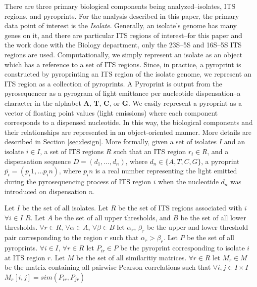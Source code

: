 \documentclass[12pt]{ucthesis}
\begin{document}
      There are three primary biological components being analyzed--isolates,
      ITS regions, and pyroprints. For the analysis described in this paper,
      the primary data point of interest is the \textit{Isolate}. Generally,
      an isolate's genome has many genes on it, and there are particular
      ITS regions of interest--for this paper and the work done with the
      Biology department, only the 23S--5S and 16S--5S ITS regions are used.
      Computationally, we simply represent an isolate as an object
      which has a reference to a set of ITS regions. Since, in practice, a
      pyroprint is constructed by pyroprinting an ITS region of the isolate
      genome, we represent an ITS region as a collection of pyroprints. A
      Pyroprint is output from the pyrosequencer as a pyrogram of light
      emittance per nucleotide dispensation--a character in the alphabet
      \textbf{A}, \textbf{T}, \textbf{C}, or \textbf{G}. We easily represent a
      pyroprint as a vector of floating point values (light emissions) where
      each component corresponds to a dispensed nucleotide. In this way, the
      biological components and their relationships are represented in an
      object-oriented manner. More details are described in Section
      \ref{sec:design}. More formally, given a set of isolates $I$ and an
      isolate $i \in I$, a set of ITS regions $R$ such that an ITS region $r_i
      \in R$, and a dispensation sequence $D = (d_1, \ldots, d_n)$, where $d_n
      \in \{A, T, C, G\}$, a pyroprint $\bar{p_i} = (p_i1,\ldots p_in)$, where
      $p_in$ is a real number representing the light emitted during the
      pyrosequencing process of ITS region $i$ when the nucleotide $d_n$ was
      introduced on dispensation $n$.

      Let $I$ be the set of all isolates. Let $R$ be the set of ITS regions
      associated with $i$ $\forall i \in I$ $R$. Let $A$ be the set of all upper
      thresholds, and $B$ be the set of all lower thresholds. $\forall r \in R$,
      $\forall \alpha \in A$, $\forall \beta \in B$ let $\alpha_r$, $\beta_r$ be the
      upper and lower threshold pair corresponding to the region $r$ such that
      $\alpha_r > \beta_r$. Let $P$ be the set of all pyroprints. $\forall i \in I$,
      $\forall r \in R$ let $P_{ir} \in P$ be the pyroprint corresponding to isolate
      $i$ at ITS region $r$. Let $M$ be the set of all similaritiy matrices.
      $\forall r \in R$ let $M_r \in M$ be the matrix containing all pairwise Pearson
      correlations such that $\forall i,j \in I \times I$ $M_r[i,j] = sim(P_{ir},
      P_{jr})$
      
\end{document}
